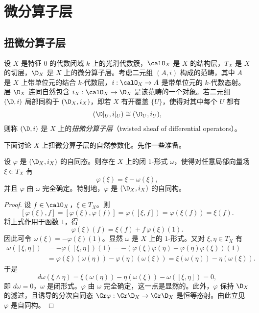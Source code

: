 \chapter{微分算子层}
\label{chap:01.1}

\section{扭微分算子层}
\label{sec:01.1.1}

设 $X$ 是特征 $0$ 的代数闭域 $k$ 上的光滑代数簇，$\calO_X$ 是 $X$ 的结构层，$T_X$ 是 $X$ 的切层，$\D_X$ 是 $X$ 上的微分算子层。考虑二元组 $(A,i)$ 构成的范畴，其中 $A$ 是 $X$ 上带单位元的结合 $k$-代数层，$i:\calO_X\to A$ 是带单位元的 $k$-代数态射。层 $\D_X$ 连同自然包含 $i_X:\calO_X\to\D_X$ 是该范畴的一个对象。若二元组 $(\D,i)$ 局部同构于 $(\D_X,i_X)$，即若 $X$ 有开覆盖 $\{U\}$，使得对其中每个 $U$ 都有
$$(\D|_U,i|_U)\cong(\D_U,i_U),$$
则称 $(\D,i)$ 是 $X$ 上的\emph{扭微分算子层}（twisted sheaf of differential operators）。

下面讨论 $X$ 上扭微分算子层的自然参数化。先作一些准备。

\begin{lemma}\label{lem:01.1.1}
设 $\varphi$ 是 $(\D_X,i_X)$ 的自同态。则存在 $X$ 上的闭 $1$-形式 $\omega$，使得对任意局部向量场 $\xi\in T_X$ 有
$$\varphi(\xi)=\xi-\omega(\xi),$$
并且 $\varphi$ 由 $\omega$ 完全确定。特别地，$\varphi$ 是 $(\D_X,i_X)$ 的自同构。
\end{lemma}

\begin{proof}
设 $f\in\calO_X$，$\xi\in T_X$。则
$$[\varphi(\xi),f]=[\varphi(\xi),\varphi(f)]=\varphi([\xi,f])=\varphi(\xi(f))=\xi(f).$$
将上式作用于函数 $1$，得
$$\varphi(\xi)(f)=\xi(f)+f\,\varphi(\xi)(1).$$
因此可令 $\omega(\xi)=-\varphi(\xi)(1)$。显然 $\omega$ 是 $X$ 上的 $1$-形式。又对 $\xi,\eta\in T_X$ 有
\begin{align*}
\omega([\xi,\eta])&=-\varphi([\xi,\eta])(1)=-(\varphi(\xi)\varphi(\eta)-\varphi(\eta)\varphi(\xi))(1)\\
&=\varphi(\xi)(\omega(\eta))-\varphi(\eta)(\omega(\xi))=\xi(\omega(\eta))-\eta(\omega(\xi)).
\end{align*}
于是
$$d\omega(\xi\wedge\eta)=\xi(\omega(\eta))-\eta(\omega(\xi))-\omega([\xi,\eta])=0,$$
即 $d\omega=0$，$\omega$ 是闭形式。$\varphi$ 由 $\omega$ 完全确定，这一点是显然的。此外，$\varphi$ 保持 $\D_X$ 的滤过，且诱导的分次自同态 $\Gr\varphi:\Gr\D_X\to\Gr\D_X$ 是恒等态射。由此立见 $\varphi$ 是自同构。
\end{proof}

